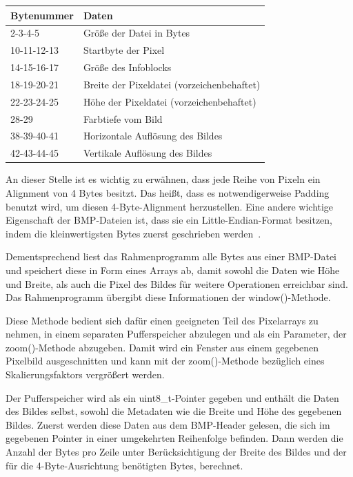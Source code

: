 \documentclass[course=erap]{aspdoc}
\begin{document}
    \begin{center}
        \begin{tabular}{| l | l  |}
            \hline
            Bytenummer & Daten \\ \hline
            2-3-4-5 & Größe der Datei in Bytes \\ \hline
            10-11-12-13 & Startbyte der Pixel  \\ \hline
            14-15-16-17 & Größe des Infoblocks \\ \hline
            18-19-20-21 & Breite der Pixeldatei (vorzeichenbehaftet) \\ \hline
            22-23-24-25 & Höhe der Pixeldatei (vorzeichenbehaftet) \\ \hline
            28-29 & Farbtiefe vom Bild \\ \hline
            38-39-40-41 & Horizontale Auflösung des Bildes \\ \hline
            42-43-44-45 & Vertikale Auflösung des Bildes \\ \hline
        \end{tabular}
    \end{center}


    An dieser Stelle ist es wichtig zu erwähnen, dass jede Reihe von Pixeln ein Alignment von 4 Bytes besitzt.
    Das heißt, dass es notwendigerweise Padding benutzt wird, um diesen 4-Byte-Alignment herzustellen.
    Eine andere wichtige Eigenschaft der BMP-Dateien ist, dass sie ein Little-Endian-Format besitzen,
    indem die kleinwertigsten Bytes zuerst geschrieben werden~\cite{bitMapHeaderTypes}.

    Dementsprechend liest das Rahmenprogramm alle Bytes aus einer BMP-Datei und speichert diese in Form eines Arrays ab,
    damit sowohl die Daten wie Höhe und Breite, als auch die Pixel des Bildes für weitere Operationen erreichbar sind.
    Das Rahmenprogramm übergibt diese Informationen der window()-Methode.

    Diese Methode bedient sich dafür einen geeigneten Teil des Pixelarrays zu nehmen, in einem separaten Pufferspeicher
    abzulegen und als ein Parameter, der zoom()-Methode abzugeben. Damit wird ein Fenster aus einem gegebenen Pixelbild
    ausgeschnitten und kann mit der zoom()-Methode bezüglich eines Skalierungsfaktors vergrößert werden.

    Der Pufferspeicher wird als ein uint8\_t-Pointer gegeben und enthält die Daten des Bildes selbst, sowohl die Metadaten
    wie die Breite und Höhe des gegebenen Bildes. Zuerst werden diese Daten aus dem BMP-Header gelesen, die sich im gegebenen
    Pointer in einer umgekehrten Reihenfolge befinden. Dann werden die Anzahl der Bytes pro Zeile unter Berücksichtigung der
    Breite des Bildes und der für die 4-Byte-Ausrichtung benötigten Bytes, berechnet.
\end{document}
